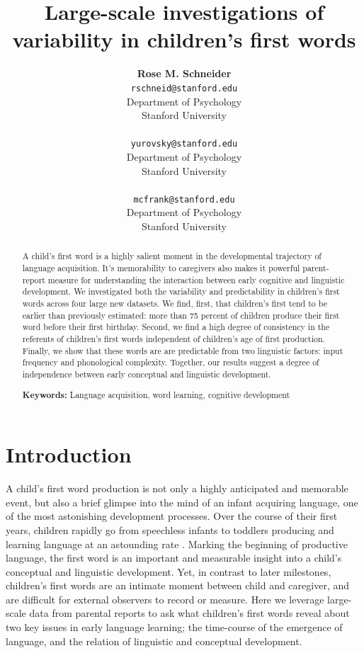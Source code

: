 \documentclass[10pt,letterpaper]{article}
\title{Large-scale investigations of variability in children's first words}
\author{{\large \bf Rose M. Schneider} \\ \texttt{rschneid@stanford.edu}\\ Department of Psychology \\ Stanford University \\ 
\And {\large \bf Daniel Yurovsky} \\ \texttt{yurovsky@stanford.edu} \\ Department of Psychology \\ Stanford University \\ 
\And {\large \bf Michael C. Frank} \\ \texttt{mcfrank@stanford.edu} \\ Department of Psychology \\ Stanford University \\ }
\begin{document}
\maketitle


\begin{abstract}
A child's first word is a highly salient moment in the developmental trajectory of language acquisition. It's memorability to caregivers also makes it powerful parent-report measure for understanding the interaction between early cognitive and linguistic development. We investigated both the variability and predictability in children's first words across four large new datasets. We find, first, that children's first tend to be earlier than previously estimated: more than 75 percent of children produce their first word before their first birthday. Second, we find a high degree of consistency in the referents of children's first words independent of children's age of first production. Finally, we show that these words are are predictable from two linguistic factors: input frequency and phonological complexity. Together, our results suggest a degree of independence between early conceptual and linguistic development.

\textbf{Keywords:}
Language acquisition, word learning, cognitive development
\end{abstract}

\section{Introduction}

A child's first word production is not only a highly anticipated and memorable event, but also a brief glimpse into the mind of an infant acquiring language, one of the most astonishing development processes. Over the course of their first years, children rapidly go from speechless infants to toddlers producing and learning language at an astounding rate \cite{fenson1994,bloom2002}. Marking the beginning of productive language, the first word is an important and measurable insight into a child's conceptual and linguistic development. Yet, in contrast to later milestones, children's first words are an intimate moment between child and caregiver, and are difficult for external observers to record or measure. Here we leverage large-scale data from parental reports to ask what children's first words reveal about two key issues in early language learning; the time-course of the emergence of language, and the relation of linguistic and conceptual development. 
\end{document}
